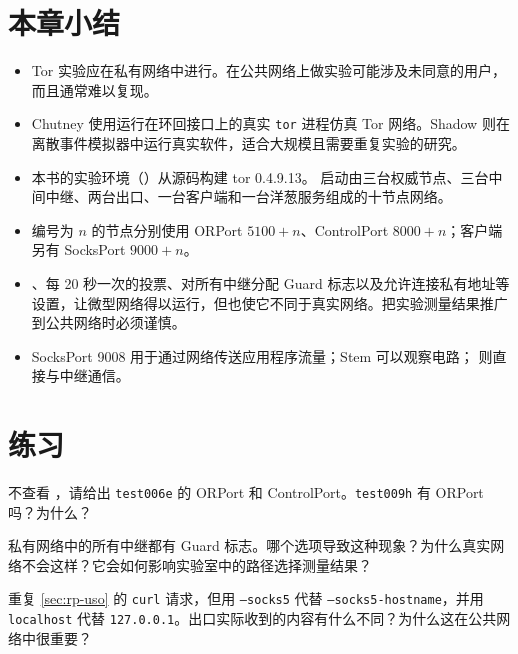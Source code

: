 \section*{本章小结}
\begin{itemize}
  \item Tor 实验应在私有网络中进行。在公共网络上做实验可能涉及未同意的用户，而且通常难以复现。
  \item Chutney 使用运行在环回接口上的真实 \texttt{tor} 进程仿真 Tor 网络。Shadow 则在离散事件模拟器中运行真实软件，适合大规模且需要重复实验的研究。
  \item 本书的实验环境（）从源码构建 tor 0.4.9.13。 启动由三台权威节点、三台中间中继、两台出口、一台客户端和一台洋葱服务组成的十节点网络。
  \item 编号为 $n$ 的节点分别使用 ORPort $5100+n$、ControlPort $8000+n$；客户端另有 SocksPort $9000+n$。
  \item {}、每 20 秒一次的投票、对所有中继分配 Guard 标志以及允许连接私有地址等设置，让微型网络得以运行，但也使它不同于真实网络。把实验测量结果推广到公共网络时必须谨慎。
  \item SocksPort 9008 用于通过网络传送应用程序流量；Stem 可以观察电路； 则直接与中继通信。
\end{itemize}

\section*{练习}

\begin{esercizio}[1]\label{es:19-porte}
不查看 ，请给出 \texttt{test006e} 的 ORPort 和 ControlPort。\texttt{test009h} 有 ORPort 吗？为什么？
\end{esercizio}

\begin{esercizio}[1]\label{es:19-guard}
私有网络中的所有中继都有 Guard 标志。哪个选项导致这种现象？为什么真实网络不会这样？它会如何影响实验室中的路径选择测量结果？
\end{esercizio}

\begin{esercizio}[1]\label{es:19-socks}
重复 \cref{sec:rp-uso} 的 \texttt{curl} 请求，但用 \texttt{--socks5} 代替 \texttt{--socks5-hostname}，并用 \texttt{localhost} 代替 \texttt{127.0.0.1}。出口实际收到的内容有什么不同？为什么这在公共网络中很重要？
\end{esercizio}

